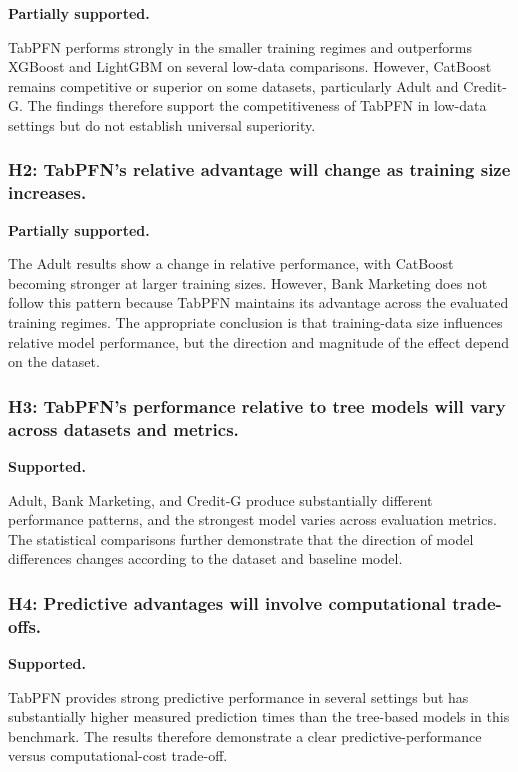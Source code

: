 \textbf{Partially supported.}

TabPFN performs strongly in the smaller training regimes and outperforms XGBoost and LightGBM on several low-data comparisons. However, CatBoost remains competitive or superior on some datasets, particularly Adult and Credit-G. The findings therefore support the competitiveness of TabPFN in low-data settings but do not establish universal superiority.

\subsubsection{H2: TabPFN's relative advantage will change as training size increases.}\label{h2-tabpfns-relative-advantage-will-change-as-training-size-increases.}

\textbf{Partially supported.}

The Adult results show a change in relative performance, with CatBoost becoming stronger at larger training sizes. However, Bank Marketing does not follow this pattern because TabPFN maintains its advantage across the evaluated training regimes. The appropriate conclusion is that training-data size influences relative model performance, but the direction and magnitude of the effect depend on the dataset.

\subsubsection{H3: TabPFN's performance relative to tree models will vary across datasets and metrics.}\label{h3-tabpfns-performance-relative-to-tree-models-will-vary-across-datasets-and-metrics.}

\textbf{Supported.}

Adult, Bank Marketing, and Credit-G produce substantially different performance patterns, and the strongest model varies across evaluation metrics. The statistical comparisons further demonstrate that the direction of model differences changes according to the dataset and baseline model.

\subsubsection{H4: Predictive advantages will involve computational trade-offs.}\label{h4-predictive-advantages-will-involve-computational-trade-offs.}

\textbf{Supported.}

TabPFN provides strong predictive performance in several settings but has substantially higher measured prediction times than the tree-based models in this benchmark. The results therefore demonstrate a clear predictive-performance versus computational-cost trade-off.

